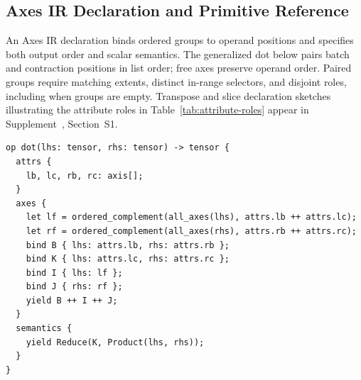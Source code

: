 \subsection{Axes IR Declaration and Primitive Reference}
\label{app:axes-ir-declarations-primitives}
\label{app:language-declarations}
An Axes IR declaration binds ordered groups to operand positions and
specifies both output order and scalar semantics. The generalized dot below
pairs batch and contraction positions in list order; free axes preserve
operand order. Paired groups require matching extents, distinct in-range
selectors, and disjoint roles, including when groups are empty.
Transpose and slice declaration sketches illustrating the attribute roles
in Table~\ref{tab:attribute-roles} appear in Supplement~\cite{tepl-supplement},
Section~S1.

\begin{lstlisting}[language=TEPL,
  caption={Axes IR representation of generalized dot, with explicit attributes, axis bindings, and value semantics.},
  label={lst:dot-declaration}]
op dot(lhs: tensor, rhs: tensor) -> tensor {
  attrs {
    lb, lc, rb, rc: axis[];
  }
  axes {
    let lf = ordered_complement(all_axes(lhs), attrs.lb ++ attrs.lc);
    let rf = ordered_complement(all_axes(rhs), attrs.rb ++ attrs.rc);
    bind B { lhs: attrs.lb, rhs: attrs.rb };
    bind K { lhs: attrs.lc, rhs: attrs.rc };
    bind I { lhs: lf };
    bind J { rhs: rf };
    yield B ++ I ++ J;
  }
  semantics {
    yield Reduce(K, Product(lhs, rhs));
  }
}
\end{lstlisting}

